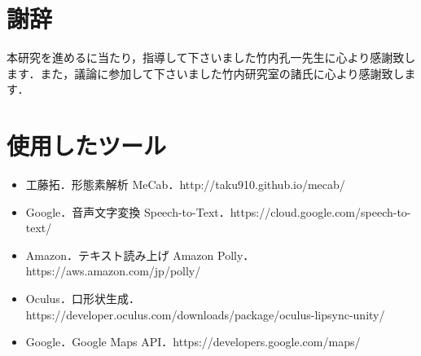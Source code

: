 \documentclass[10pt,uplatex,a4j]{jsarticle}
\begin{document}





\newpage
\setcounter{tocdepth}{3}
\tableofcontents
\newpage

\pagestyle{fancy}
\lhead{\leftmark}
\rhead{\thepage}
\lfoot{}
\cfoot{}
\renewcommand{\footrulewidth}{0.4pt}

\setcounter{page}{1}








\section*{謝辞}
本研究を進めるに当たり，指導して下さいました竹内孔一先生に心より感謝致します．また，議論に参加して下さいました竹内研究室の諸氏に心より感謝致します．

\section*{使用したツール}
\begin{itemize}
\item 工藤拓．形態素解析 MeCab．http://taku910.github.io/mecab/
\item Google．音声文字変換 Speech-to-Text．https://cloud.google.com/speech-to-text/
\item Amazon．テキスト読み上げ Amazon Polly．https://aws.amazon.com/jp/polly/
\item Oculus．口形状生成．https://developer.oculus.com/downloads/package/oculus-lipsync-unity/
\item Google．Google Maps API．https://developers.google.com/maps/
\end{itemize}


\nocite{*}




\end{document}
